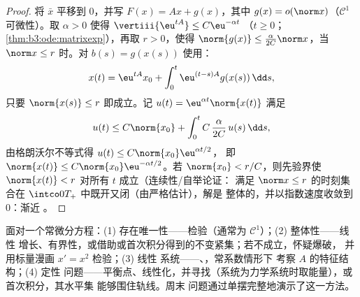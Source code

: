 \begin{proof}
将 $\bar x$ 平移到 $0$，并写 $F(x) = Ax + g(x)$，其中
$g(x) = o(\norm x)$（$\mathcal C^1$ 可微性）。取
$\alpha > 0$ 使得 $\vertiii{\eu^{tA}} \leq C\eu^{-\alpha t}$
（$t \geq 0$；\cref{thm:b3:ode:matrixexp}），再取 $r > 0$，使得
$\norm{g(x)} \leq \frac{\alpha}{2C}\norm x$，当 $\norm x \leq
r$ 时。对 $b(s) = g(x(s))$ 使用：
\[
x(t) = \eu^{tA}x_0 + \int_0^t\eu^{(t-s)A}g(x(s))\,\dd s,
\]
只要 $\norm{x(s)} \leq r$ 即成立。记 $u(t) =
\eu^{\alpha t}\norm{x(t)}$ 满足
\[
u(t) \leq C\norm{x_0} +
\int_0^{t}C\,\frac{\alpha}{2C}\,u(s)\,\dd s ,
\]
由格朗沃尔不等式得 $u(t) \leq C\norm{x_0}\eu^{\alpha t/2}$，
即 $\norm{x(t)} \leq C\norm{x_0}\eu^{-\alpha t/2}$。若
$\norm{x_0} < r/C$，则先验界使 $\norm{x(t)} <
r$ 对所有 $t$ 成立（连续性/自举论证：
满足 $\norm x \leq r$ 的时刻集合在
$\intco0{T_+}$ 中既开又闭（由严格估计），解是
整体的，并以指数速度收敛到 $0$：渐近
。
\end{proof}

\begin{method}\label{met:b3:ode:strategy}
面对一个常微分方程：(1) 存在唯一性——检验（通常为 $\mathcal C^1$）；(2) 整体性——线性
增长、有界性，或借助或首次积分得到的不变紧集；若不成立，怀疑爆破，
并用标量漫画 $x' = x^2$ 检验；(3) 线性
系统——、，常系数情形下
考察 $A$ 的特征结构；(4) 定性
问题——平衡点、线性化，并寻找（系统为力学系统时取能量），或首次积分，其水平集
能够围住轨线。周末
问题通过单摆完整地演示了这一方法。
\end{method}

